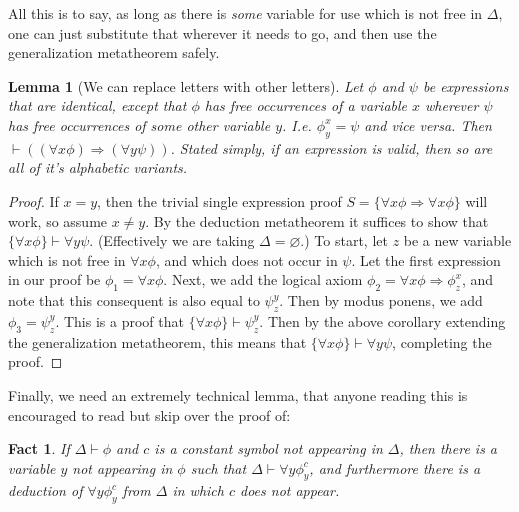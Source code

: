 \documentclass{article}
\theoremstyle{definition}
\theoremstyle{plain}
\theoremstyle{theorem}
\newtheorem{fact}{Fact}[section]
\newtheorem{lemma}{Lemma}[section]
\begin{document}
All this is to say, as long as there is \textit{some} variable for use which is not free in $\Delta$, one can just substitute that wherever it needs to go, and then use the generalization metatheorem safely. 
\begin{lemma}[We can replace letters with other letters]
    Let $\phi$ and $\psi$ be expressions that are identical, except that $\phi$ has free occurrences of a variable $x$ wherever $\psi$ has free occurrences of some other variable $y$. I.e. $\phi_y^x = \psi$ and vice versa. Then $\vdash ((\forall x \phi) \Rightarrow (\forall y \psi))$. Stated simply, if an expression is valid, then so are all of it's alphabetic variants.
\end{lemma}
\begin{proof}
    If $x =y$, then the trivial single expression proof $S = \{\forall x \phi \Rightarrow \forall x \phi\}$ will work, so assume $x \neq y$. By the deduction metatheorem it suffices to show that $\{\forall x \phi \} \vdash \forall y \psi$. (Effectively we are taking $\Delta = \varnothing$.) To start, let $z$ be a new variable which is not free in $\forall x \phi$, and which does not occur in $\psi$. Let the first expression in our proof be $\phi_1 = \forall x \phi$. Next, we add the logical axiom $\phi_2 = \forall x \phi \Rightarrow \phi_z^x$, and note that this consequent is also equal to $\psi_z^y$. Then by modus ponens, we add $\phi_3 = \psi_z^y$. This is a proof that $\{\forall x \phi \} \vdash \psi_z^y$. Then by the above corollary extending the generalization metatheorem, this means that $\{\forall x \phi \} \vdash \forall y \psi$, completing the proof.
\end{proof}
Finally, we need an extremely technical lemma, that anyone reading this is encouraged to read but skip over the proof of:
\begin{fact}
    If $\Delta \vdash \phi$ and $c$ is a constant symbol not appearing in $\Delta$, then there is a variable $y$ not appearing in $\phi$ such that $\Delta \vdash \forall y \phi_y^c$, and furthermore there is a deduction of $\forall y \phi_y^c$ from $\Delta$ in which $c$ does not appear.  
\end{fact}
\end{document}
